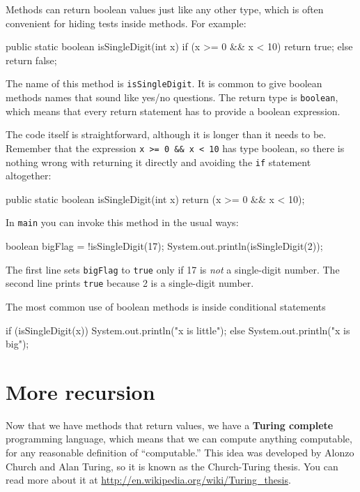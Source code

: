 Methods can return boolean values just like any other type,
which is often convenient for hiding tests inside
methods.  For example:

\begin{code}
  public static boolean isSingleDigit(int x) {
    if (x >= 0 && x < 10) {
      return true;
    } else {
      return false;
    }
  }
\end{code}

The name of this method is {\tt isSingleDigit}.  It is common
to give boolean methods names that sound like yes/no questions.
The return type is {\tt boolean}, which means that every return
statement has to provide a boolean expression.

The code itself is straightforward, although it is longer than
it needs to be.  Remember that the expression {\tt x >= 0 \&\& x < 10}
has type boolean, so there is nothing wrong with returning it
directly and avoiding the {\tt if} statement altogether:

\begin{code}
  public static boolean isSingleDigit(int x) {
    return (x >= 0 && x < 10);
  }
\end{code}

In {\tt main} you can invoke this method in the usual ways:

\begin{code}
  boolean bigFlag = !isSingleDigit(17);
  System.out.println(isSingleDigit(2));
\end{code}

The first line sets {\tt bigFlag} to {\tt true}
only if 17 is {\em not} a single-digit number.  The second
line prints {\tt true} because 2 is a single-digit number.

The most common use of boolean methods is inside conditional
statements

\begin{code}
    if (isSingleDigit(x)) {
      System.out.println("x is little");
    } else {
      System.out.println("x is big");
    }
\end{code}


\section{More recursion}
\label{factorial}

Now that we have methods that return values, we have a {\bf Turing
  complete} programming language, which means that we can compute
anything computable, for any reasonable definition of ``computable.''
%
This idea was developed by Alonzo Church and Alan Turing, so it is
known as the Church-Turing thesis.  You can read more about it at
\url{http://en.wikipedia.org/wiki/Turing_thesis}.

